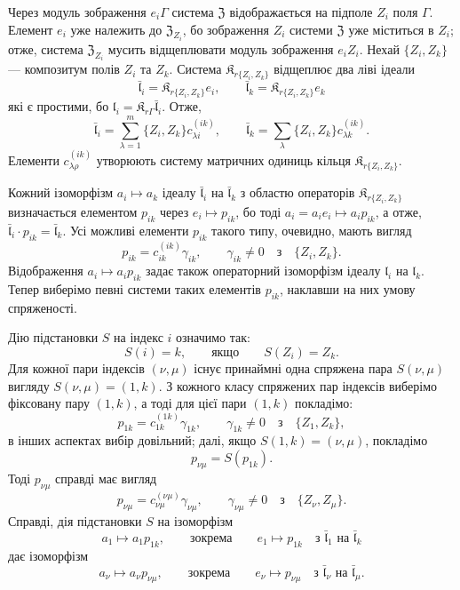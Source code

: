 \documentclass[11pt]{article}
\begin{document}
Через модуль зображення \(e_i\Gamma\) система \(\mathfrak Z\) відображається на підполе \(Z_i\) поля \(\Gamma\). Елемент \(e_i\) уже належить до \(\mathfrak Z_{Z_i}\), бо зображення \(Z_i\) системи \(\mathfrak Z\) уже міститься в \(Z_i\); отже, система \(\mathfrak Z_{Z_i}\) мусить відщеплювати модуль зображення \(e_iZ_i\). Нехай \(\{Z_i,Z_k\}\) --- композитум полів \(Z_i\) та \(Z_k\). Система \(\mathfrak K_{r\{Z_i,Z_k\}}\) відщеплює два ліві ідеали
\[
\bar{\mathfrak l}_i=\mathfrak K_{r\{Z_i,Z_k\}}e_i,\qquad
\bar{\mathfrak l}_k=\mathfrak K_{r\{Z_i,Z_k\}}e_k
\]
які є простими, бо \(\mathfrak l_i=\mathfrak K_{r\Gamma}\bar{\mathfrak l}_i\). Отже,
\[
\bar{\mathfrak l}_i=\sum_{\lambda=1}^m\{Z_i,Z_k\}c_{\lambda i}^{(ik)},\qquad
\bar{\mathfrak l}_k=\sum_{\lambda}\{Z_i,Z_k\}c_{\lambda k}^{(ik)}.
\]
Елементи \(c_{\lambda\rho}^{(ik)}\) утворюють систему матричних одиниць кільця \(\mathfrak K_{r\{Z_i,Z_k\}}\).

Кожний ізоморфізм \(a_i\mapsto a_k\) ідеалу \(\bar{\mathfrak l}_i\) на \(\bar{\mathfrak l}_k\) з областю операторів \(\mathfrak K_{r\{Z_i,Z_k\}}\) визначається елементом \(p_{ik}\) через \(e_i\mapsto p_{ik}\), бо тоді \(a_i=a_ie_i\mapsto a_ip_{ik}\), а отже, \(\bar{\mathfrak l}_i\cdot p_{ik}=\bar{\mathfrak l}_k\). Усі можливі елементи \(p_{ik}\) такого типу, очевидно, мають вигляд
\[
p_{ik}=c_{ik}^{(ik)}\gamma_{ik},\qquad \gamma_{ik}\ne0\quad\text{з}\quad \{Z_i,Z_k\}.
\]
Відображення \(a_i\mapsto a_ip_{ik}\) задає також операторний ізоморфізм ідеалу \(\mathfrak l_i\) на \(\mathfrak l_k\). Тепер виберімо певні системи таких елементів \(p_{ik}\), наклавши на них умову спряженості.

Дію підстановки \(S\) на індекс \(i\) означимо так:
\[
S(i)=k,\qquad\text{якщо}\qquad S(Z_i)=Z_k.
\]
Для кожної пари індексів \((\nu,\mu)\) існує принаймні одна спряжена пара \(S(\nu,\mu)\) вигляду \(S(\nu,\mu)=(1,k)\). З кожного класу спряжених пар індексів виберімо фіксовану пару \((1,k)\), а тоді для цієї пари \((1,k)\) покладімо:
\[
p_{1k}=c_{1k}^{(1k)}\gamma_{1k},\qquad \gamma_{1k}\ne0\quad\text{з}\quad \{Z_1,Z_k\},
\]
в інших аспектах вибір довільний; далі, якщо \(S(1,k)=(\nu,\mu)\), покладімо
\[
p_{\nu\mu}=S(p_{1k}).
\]
Тоді \(p_{\nu\mu}\) справді має вигляд
\[
p_{\nu\mu}=c_{\nu\mu}^{(\nu\mu)}\gamma_{\nu\mu},\qquad
\gamma_{\nu\mu}\ne0\quad\text{з}\quad \{Z_\nu,Z_\mu\}.
\]
Справді, дія підстановки \(S\) на ізоморфізм
\[
a_1\mapsto a_1p_{1k},\qquad\text{зокрема}\qquad e_1\mapsto p_{1k}
\quad\text{з }\bar{\mathfrak l}_1\text{ на }\bar{\mathfrak l}_k
\]
дає ізоморфізм
\[
a_\nu\mapsto a_\nu p_{\nu\mu},\qquad\text{зокрема}\qquad e_\nu\mapsto p_{\nu\mu}
\quad\text{з }\bar{\mathfrak l}_\nu\text{ на }\bar{\mathfrak l}_\mu.
\]
\end{document}
